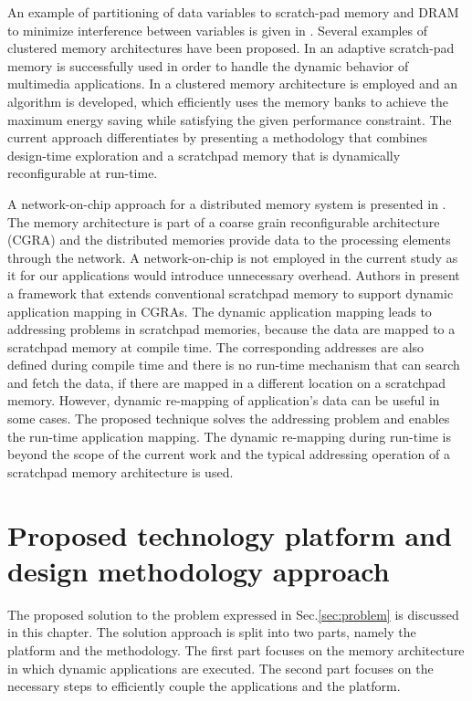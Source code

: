 An example of partitioning of data variables to scratch-pad memory and DRAM to minimize interference between variables is given in \cite{7}. 
Several examples of clustered memory architectures have been proposed.
In \cite{cho2009adaptive} an adaptive scratch-pad memory is successfully used in order to handle the dynamic behavior of multimedia applications.
In \cite{wang2005energy} a clustered memory architecture is employed and an algorithm is developed, which efficiently uses the memory banks to achieve the maximum energy saving while satisfying the given performance constraint.
The current approach differentiates by presenting a methodology that combines design-time exploration and a scratchpad memory that is dynamically reconfigurable at run-time.

A network-on-chip approach for a distributed memory system is presented in \cite{ahmed1}.
The memory architecture is part of a coarse grain reconfigurable architecture (CGRA) and the distributed memories provide data to the processing elements through the network.
A network-on-chip is not employed in the current study as it for our applications would introduce unnecessary overhead.
Authors in \cite{ahmed2} present a framework that extends conventional scratchpad memory to support dynamic application mapping in CGRAs. 
The dynamic application mapping leads to addressing problems in scratchpad memories, because the data are mapped to a scratchpad memory at compile time.
The corresponding addresses are also defined during compile time and there is no run-time mechanism that can search and fetch the data, if there are mapped in a different location on a scratchpad memory.
However, dynamic re-mapping of application's data can be useful in some cases.
The proposed technique solves the addressing problem and enables the run-time application mapping.
The dynamic re-mapping during run-time is beyond the scope of the current work and the typical addressing operation of a scratchpad memory architecture is used.

\chapter{Proposed technology platform and design methodology approach}
\label{method}
The proposed solution to the problem expressed in Sec.\ref{sec:problem} is discussed in this chapter.
The solution approach is split into two parts, namely the platform and the methodology.
The first part focuses on the memory architecture in which dynamic applications are executed.
The second part focuses on the necessary steps to efficiently couple the applications and the platform.


